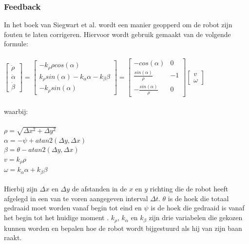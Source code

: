 \documentclass[a4paper]{article}
\begin{document}
\subsubsection{Feedback}
In het boek van Siegwart et al. wordt een manier geopperd om de robot zijn fouten te laten corrigeren. Hiervoor wordt gebruik gemaakt van de volgende formule:\\\\
$
\begin{bmatrix}
\dot{\rho}\\
\dot{\alpha}\\
\dot{\beta}
\end{bmatrix}
=
\begin{bmatrix}
-k_{\rho}\rho cos(\alpha)\\
k_{\rho}sin(\alpha)-k_{\alpha}\alpha-k_{\beta}\beta\\
-k_{\rho}sin(\alpha)
\end{bmatrix}
=
\begin{bmatrix}
- cos(\alpha) & 0 \\
\frac{sin(\alpha)}{\rho} & -1\\
-\frac{sin(\alpha)}{\rho} & 0
\end{bmatrix}
\begin{bmatrix}
v \\
\omega
\end{bmatrix}
$
\\\\
waarbij:\\\\
$\rho = \sqrt{\Delta x^2 + \Delta y^2}$\\
$\alpha = -\psi+ atan2(\Delta y, \Delta x)$\\
$\beta = \theta - atan2(\Delta y, \Delta x)$\\
$v = k_{\rho}\rho$\\
$\omega = k_{\alpha}\alpha  + k_{\beta}\beta$\\\\
Hierbij zijn $\Delta x$ en $\Delta y$ de afstanden in de $x$ en $y$ richting die de robot heeft afgelegd in een van te voren aangegeven interval $\Delta t$. $\theta$ is de hoek die totaal gedraaid moet worden vanaf begin tot eind en $\psi$ is de hoek die gedraaid is vanaf het begin tot het huidige moment . $k_{\rho}$, $k_{\alpha}$ en $k_{\beta}$ zijn drie variabelen die gekozen kunnen worden en bepalen hoe de robot wordt bijgestuurd als hij van zijn baan raakt.\\
\end{document}
